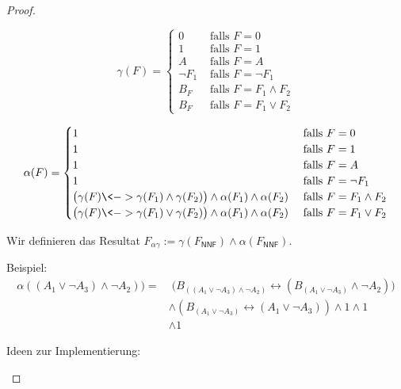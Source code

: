 \begin{proof}
\begin{enumerate}
 $$\gamma(F)=
 \begin{cases}
   0 & \text{ falls } F=0\\
   1 & \text{ falls } F=1\\
   A & \text{ falls } F=A\\
   \neg F_1 & \text{ falls } F=\neg F_1\\
   B_F & \text{ falls } F=F_1\land F_2\\
   B_F & \text{ falls } F=F_1\lor F_2
  \end{cases}$$
 
 
 
 $$\alpha(F)=
 \begin{cases}
   1 & \text{ falls } F=0\\
   1 & \text{ falls } F=1\\
   1 & \text{ falls } F=A\\
   1 & \text{ falls } F=\neg F_1\\
   \big(\gamma(F)\<-> \gamma(F_1) \land \gamma(F_2)\big)\land\alpha(F_1)\land\alpha(F_2) & \text{ falls } F=F_1\land F_2\\
   \big(\gamma(F)\<-> \gamma(F_1) \lor \gamma(F_2)\big)\land\alpha(F_1)\land\alpha(F_2) & \text{ falls } F=F_1\lor F_2
  \end{cases}$$
  
  Wir definieren das Resultat $F_{\alpha\gamma}:=\gamma(F_\mathsf{NNF})\land \alpha(F_\mathsf{NNF})$.
  
  Beispiel:
  \begin{align*}
   \alpha((A_1\lor \neg A_3)\land \neg A_2)) = & \;
  \big(B_{((A_1\lor \neg A_3)\land \neg A_2)} \leftrightarrow (B_{(A_1\lor \neg A_3)} \land \neg A_2)\big)\\
  & \land (B_{(A_1\lor \neg A_3)} \leftrightarrow (A_1\lor \neg A_3)) \land 1 \land 1\\
  & \land 1
  \end{align*}

  
  Ideen zur Implementierung:
  

\end{enumerate}
\end{proof}
